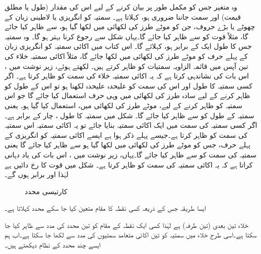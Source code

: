 وہ متغیر جس کو مکمل طور پر بیان کرنے کے لیے اس کی مقدار (طول یا مطلق قیمت) اور سمت جاننا ضروری ہو،   کہلاتا ہے۔ سمتیہ کو انگریزی یا لاطینی زبان کے چھوٹے یا  بڑے حروف،  جن کو موٹے طرز کی لکھائی میں لکھا گیا ہو،  سے ظاہر کیا جائے گا، مثلاً قوت کو  سے ظاہر کیا جائے گا۔یہاں شکل   سے رجوع کرنا بہتر ہو گا۔ وہ سمتیہ جس کا طول ایک کے برابر ہو،  کہلائے گا۔ اس کتاب میں اکائی سمتیہ کو انگریزی زبان کے پہلے حرف کو موٹے طرز کی لکھائی میں لکھا جائے گا، مثلاً اکائی سمتیہ  خلاء کی تین  آپس میں قائمہ الزاویہ سمتیات  کو ظاہر کرتے ہیں۔ لکھتے ہوئے، زیر نوشت میں ، اس بات کی نشاندہی  کرتا ہے کہ یہ اکائی سمتیہ خلاء کی  سمت کو ظاہر کرتا ہے۔ اگر کسی سمتیہ  کا طول اور اس کی سمت کو علیحدہ علیحدہ لکھنا ہو تو اس کے طول کو ظاہر کرنے کے لیے سادہ طرز کی لکھائی میں وہی حرف استعمال کیا جائے گا جو اس سمتیہ کو ظاہر کرنے کے لیے، موٹے طرز کی لکھائی میں، استعمال کیا گیا ہو۔ یعنی سمتیہ  کے طول کو  سے ظاہر کیا جائے گا۔ شکل میں سمتیہ   کا طول ، چار کے برابر ہے۔ اگر کسی سمتیہ کی سمت میں ایک اکائی سمتیہ بنایا جائے تو یہ اکائی سمتیہ اس سمتیہ کی سمت کو ظاہر کرتا ہے۔جیسے پہلے ذکر ہوا ہے  ایسے اکائی سمتیہ کو انگریزی کے پہلے حرف،  جس کو موٹے طرز کی لکھائی میں لکھا گیا ہو  سے ظاہر کیا جائے گا یعنی سمتیہ  کی سمت کو  سے ظاہر کیا جائے گا۔یہاں،  زیر نوشت میں  ، اس بات کی یاد دہانی کراتا ہے کہ یہ اکائی سمتیہ  کی سمت کو ظاہر کرتا ہے۔ شکل  میں قوت  کا رخ دائیں  ہے لہٰذا   اور   برابر ہوں گے۔
\begin{figure}
\centering
%
\caption{کارتیسی محدد}
\label{شکل_حقائق_اکائی_سمتیہ}
\end{figure}
%
ایسا طریقہ جس کے ذریعہ کسی نقطہ کا مقام متعین کیا جا سکے محدد کہلاتا ہے۔

خلاء  تین بعدی (تین طرفہ)  ہے لہٰذا  کسی ایک نقطہ کے مقام کو تین محدد کی مدد سے ظاہر کیا جا سکتا ہے۔اسی طرح  خلاء میں سمتیہ کو تین اکائی متعامد سمتیوں کی مدد سے لکھا جا سکتا ہے۔اب ہم ایسے چند محدد کے نظام دیکھتے ہیں۔

